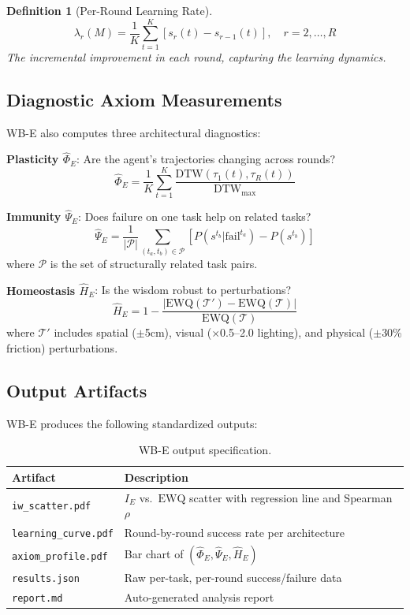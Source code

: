 \documentclass{article}
\newtheorem{definition}{Definition}
\newcommand{\cT}{\mathcal{T}}
\newcommand{\EWQ}{\mathrm{EWQ}}
\begin{document}
\begin{definition}[Per-Round Learning Rate]
\begin{equation}
    \lambda_r(M) = \frac{1}{K} \sum_{t=1}^{K} \left[s_r(t) - s_{r-1}(t)\right], \quad r = 2, \ldots, R
\end{equation}
The incremental improvement in each round, capturing the learning dynamics.
\end{definition}

\subsection{Diagnostic Axiom Measurements}

WB-E also computes three architectural diagnostics:

\textbf{Plasticity $\hat{\Phi}_E$}: Are the agent's trajectories changing across rounds?
\begin{equation}
    \hat{\Phi}_E = \frac{1}{K} \sum_{t=1}^{K} \frac{\text{DTW}(\tau_1(t), \tau_R(t))}{\text{DTW}_{\max}}
\end{equation}

\textbf{Immunity $\hat{\Psi}_E$}: Does failure on one task help on related tasks?
\begin{equation}
    \hat{\Psi}_E = \frac{1}{|\mathcal{P}|} \sum_{(t_a, t_b) \in \mathcal{P}} \left[P(s^{t_b} | \text{fail}^{t_a}) - P(s^{t_b})\right]
\end{equation}
where $\mathcal{P}$ is the set of structurally related task pairs.

\textbf{Homeostasis $\hat{H}_E$}: Is the wisdom robust to perturbations?
\begin{equation}
    \hat{H}_E = 1 - \frac{|\EWQ(\cT') - \EWQ(\cT)|}{\EWQ(\cT)}
\end{equation}
where $\cT'$ includes spatial ($\pm$5cm), visual ($\times$0.5--2.0 lighting), and physical ($\pm$30\% friction) perturbations.

\subsection{Output Artifacts}

WB-E produces the following standardized outputs:

\begin{table}[ht]
\centering
\caption{WB-E output specification.}
\label{tab:outputs}
\begin{tabular}{lp{7cm}}
\toprule
\textbf{Artifact} & \textbf{Description} \\
\midrule
\texttt{iw\_scatter.pdf} & $I_E$ vs.\ $\EWQ$ scatter with regression line and Spearman $\rho$ \\
\texttt{learning\_curve.pdf} & Round-by-round success rate per architecture \\
\texttt{axiom\_profile.pdf} & Bar chart of $(\hat{\Phi}_E, \hat{\Psi}_E, \hat{H}_E)$ \\
\texttt{results.json} & Raw per-task, per-round success/failure data \\
\texttt{report.md} & Auto-generated analysis report \\
\bottomrule
\end{tabular}
\end{table}
\end{document}
